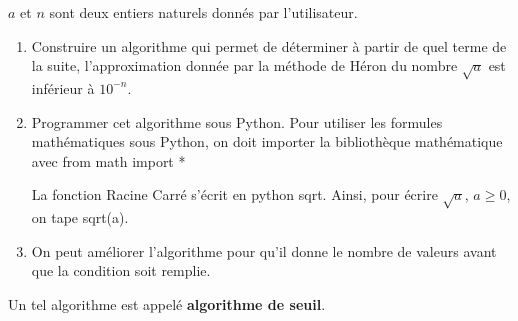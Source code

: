 
$a$ et $n$ sont deux entiers naturels donnés par l'utilisateur.
\begin{enumerate}
\item 
Construire un algorithme qui permet de déterminer à partir de quel terme de la suite, l'approximation donnée par la méthode de Héron du nombre $\sqrt{a}$ est inférieur à $10^{-n}$.
\item Programmer cet algorithme sous Python. Pour utiliser les formules mathématiques sous Python, on doit importer la bibliothèque mathématique avec {\color{orange} from} math {\color{orange} import} *

La fonction Racine Carré s'écrit en python sqrt. Ainsi, pour écrire $\sqrt{a}$, $a \geq 0$, on tape sqrt(a).
\item On peut améliorer l'algorithme pour qu'il donne le nombre de valeurs avant que la condition soit remplie.
\end{enumerate}
Un tel algorithme est appelé \textbf{algorithme de seuil}.